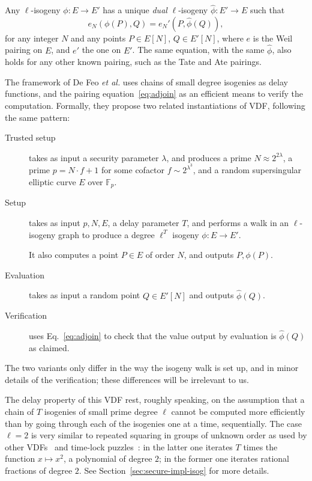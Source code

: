\documentclass{llncs}
\newcommand{\F}{\mathbb{F}}
\begin{document}
Any $\ell$-isogeny $\phi:E\to E'$ has a unique \emph{dual}
$\ell$-isogeny $\hat\phi:E'\to E$ such that
\begin{equation}
  \label{eq:adjoin}
  e_N(\phi(P),Q) = e_N'(P,\hat\phi(Q)),
\end{equation}
for any integer $N$ and any points $P\in E[N]$, $Q\in E'[N]$, where
$e$ is the Weil pairing on $E$, and $e'$ the one on $E'$. %
The same equation, with the same $\hat\phi$, also holds for any other
known pairing, such as the Tate and Ate pairings.

The framework of De Feo \emph{et al.} uses chains of small degree
isogenies as delay functions, and the pairing
equation~\eqref{eq:adjoin} as an efficient means to verify the
computation. %
Formally, they propose two related instantiations of VDF, following
the same pattern:
%
\begin{description}
\item[Trusted setup] takes as input a security parameter $\lambda$,
  and produces a prime $N\approx 2^{2\lambda}$, a prime $p=N\cdot f+1$
  for some cofactor $f\sim 2^{\lambda^3}$, and a random supersingular
  elliptic curve $E$ over $\F_p$.
\item[Setup] takes as input $p,N,E$, a delay parameter $T$, and
  performs a walk in an $\ell$-isogeny graph to produce a degree
  $\ell^T$ isogeny $\phi:E\to E'$.
  
  It also computes a point $P\in E$ of order $N$, and outputs
  $P,\phi(P)$.
\item[Evaluation] takes as input a random point $Q\in E'[N]$ and outputs
  $\hat\phi(Q)$.
\item[Verification] uses Eq.~\eqref{eq:adjoin} to check that the value
  output by evaluation is $\hat\phi(Q)$ as claimed.
\end{description}

The two variants only differ in the way the isogeny walk is set up,
and in minor details of the verification; these differences will be
irrelevant to us.

The delay property of this VDF rest, roughly speaking, on the
assumption that a chain of $T$ isogenies of small prime degree $\ell$
cannot be computed more efficiently than by going through each of the
isogenies one at a time, sequentially. %
The case $\ell=2$ is very similar to repeated squaring in groups of
unknown order as used by other VDFs~\cite{Wesolowski,Pietrzak} and
time-lock puzzles~\cite{TLP}: in the latter one iterates $T$ times the
function $x\mapsto x^2$, a polynomial of degree $2$; in the former one
iterates rational fractions of degree $2$. %
See Section~\ref{sec:secure-impl-isog} for more details.
\end{document}
